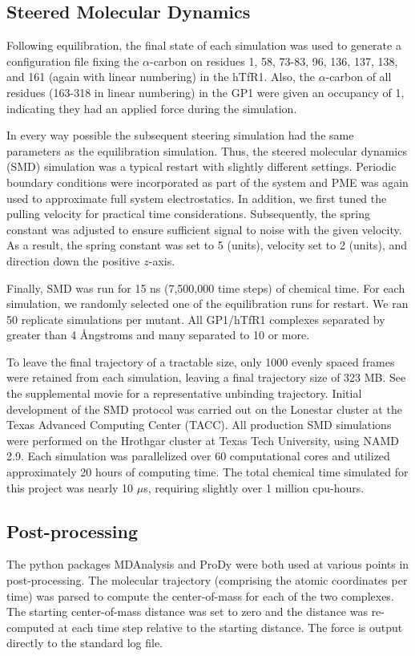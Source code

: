 \documentclass[12pt]{article}
\begin{document}
\subsection*{Steered Molecular Dynamics}
Following equilibration, the final state of each simulation was used to generate a configuration file fixing the $\alpha$-carbon on residues 1, 58, 73-83, 96, 136, 137, 138, and 161 (again with linear numbering) in the hTfR1. Also, the $\alpha$-carbon of all residues (163-318 in linear numbering) in the GP1 were given an occupancy of 1, indicating they had an applied force during the simulation. 

In every way possible the subsequent steering simulation had the same parameters as the equilibration simulation. Thus, the steered molecular dynamics (SMD) \citep{Is2001B} simulation was a typical restart with slightly different settings. Periodic boundary conditions were incorporated as part of the system and PME was again used to approximate full system electrostatics. In addition, we first tuned the pulling velocity for practical time considerations. Subsequently, the spring constant was adjusted to ensure sufficient signal to noise with the given velocity. As a result, the spring constant was set to 5 (units), velocity set to 2 (units), and direction down the positive $z$-axis.

Finally, SMD was run for 15 ns (7,500,000 time steps) of chemical time. For each simulation, we randomly selected one of the equilibration runs for restart. We ran 50 replicate simulations per mutant. All GP1/hTfR1 complexes separated by greater than 4 \AA ngstroms and many separated to 10 or more.

To leave the final trajectory of a tractable size, only 1000 evenly spaced frames were retained from each simulation, leaving a final trajectory size of 323 MB. See the supplemental movie for a representative unbinding trajectory. Initial development of the SMD protocol was carried out on the Lonestar cluster at the Texas Advanced Computing Center (TACC). All production SMD simulations were performed on the Hrothgar cluster at Texas Tech University, using NAMD 2.9. Each simulation was parallelized over 60 computational cores and utilized approximately 20 hours of computing time. The total chemical time simulated for this project was nearly 10 $\mu$s, requiring slightly over 1 million cpu-hours.

\subsection*{Post-processing}
The python packages MDAnalysis \citep{Agrawal2011} and ProDy \citep{Bakan2011} were both used at various points in post-processing. The molecular trajectory (comprising the atomic coordinates per time) was parsed to compute the center-of-mass for each of the two complexes. The starting center-of-mass distance was set to zero and the distance was re-computed at each time step relative to the starting distance. The force is output directly to the standard log file.
\end{document}
